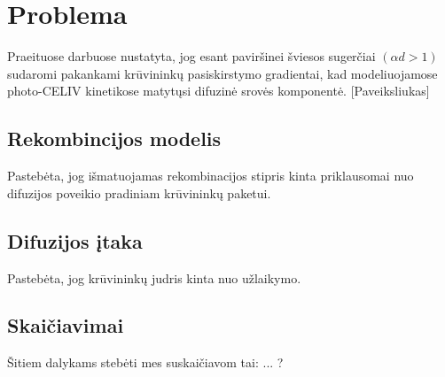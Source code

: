 \section{Problema}

Praeituose darbuose nustatyta, jog esant paviršinei šviesos sugerčiai $(\alpha d > 1)$ sudaromi pakankami krūvininkų pasiskirstymo gradientai, kad modeliuojamose photo-CELIV kinetikose matytųsi difuzinė srovės komponentė.
[Paveiksliukas]

\subsection{Rekombincijos modelis}

Pastebėta, jog išmatuojamas rekombinacijos stipris kinta priklausomai nuo difuzijos poveikio pradiniam krūvininkų paketui.

\subsection{Difuzijos įtaka}

Pastebėta, jog krūvininkų judris kinta nuo užlaikymo.

\subsection{Skaičiavimai} 

Šitiem dalykams stebėti mes suskaičiavom tai: ... ?

